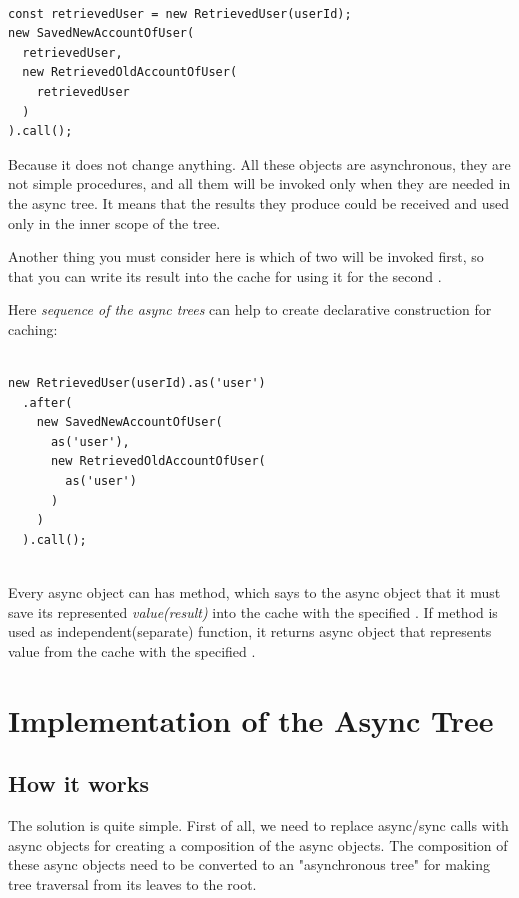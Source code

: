 \documentclass{article}
\newcommand{\cit}[1]{{\fontfamily{qcr}\selectfont{\textcolor{superdarkgray}{#1}}}}
\begin{document}
\begin{lstlisting}

const retrievedUser = new RetrievedUser(userId);
new SavedNewAccountOfUser(
  retrievedUser,
  new RetrievedOldAccountOfUser(
    retrievedUser
  )
).call();

\end{lstlisting}

Because it does not change anything. All these objects are asynchronous, they are not simple procedures, and all them will be invoked only when they are needed in the async tree. It means that the results they produce could be received and used only in the inner scope of the tree.

Another thing you must consider here is which of two \cit{RetrievedUser} will be invoked first, so that you can write its result into the cache for using it for the second \cit{RetrievedUser}.

Here \textit{sequence of the async trees} can help to create declarative construction for caching:

\begin{lstlisting}

new RetrievedUser(userId).as('user')
  .after(
    new SavedNewAccountOfUser(
      as('user'),
      new RetrievedOldAccountOfUser(
        as('user')
      )
    )
  ).call();
  
\end{lstlisting}

Every async object can has \cit{as(key)} method, which says to the async object that it must save its represented \textit{value(result)} into the cache with the specified \cit{key}. If \cit{as(key)} method is used as independent(separate) function, it returns async object that represents value from the cache with the specified \cit{key}.

\section{Implementation of the Async Tree}

\subsection{How it works}

The solution is quite simple. First of all, we need to replace async/sync calls with async objects for creating a composition of the async objects. The composition of these async objects need to be converted to an "asynchronous tree" for making tree traversal from its leaves to the root.
\end{document}
